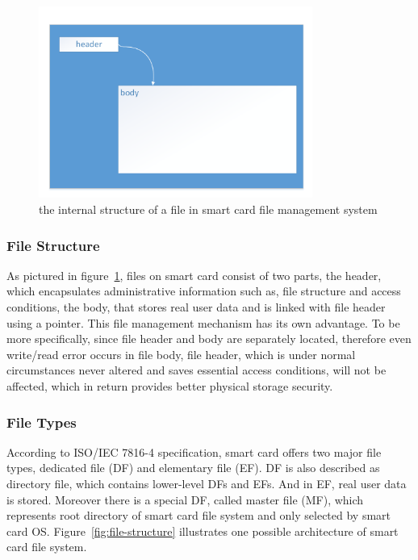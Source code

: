 \begin{figure}[!htbp]
	\centering
	\includegraphics[width=0.8\textwidth]{file}
		\caption{the internal structure of a file in smart card file management system\cite{handbuch}}
	\label{fig:file}
\end{figure}

\subsubsection{File Structure}
As pictured in figure~\ref{fig:file}, files on smart card consist of two parts,  the header, which encapsulates administrative information such as, file structure and access conditions, the body, that stores real user data and is linked with file header using a pointer. This file management mechanism has its own advantage. To be more specifically, since file header and body are separately located, therefore even write/read error occurs in file body, file header, which is under normal circumstances never altered and saves essential access conditions, will not be affected, which in return provides better physical storage security.

\subsubsection{File Types}
According to ISO/IEC 7816-4 specification, smart card offers two major file types, dedicated file (DF) and elementary file (EF). DF is also described as directory file, which contains lower-level DFs and EFs. And in EF, real user data is stored. Moreover there is a special DF, called master file (MF), which represents root directory of smart card file system and only selected by smart card OS. Figure~\ref{fig:file-structure} illustrates one possible architecture of smart card file system.

